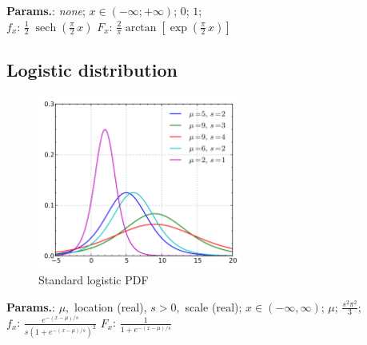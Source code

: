     {\color{darkblue} \textbf{Params.}:} {\textit{none}}; {$x \in (-\infty; +\infty)\!$}; {$0$}; {$1$};\hspace{0.5cm}\\{\color{darkblue} \textbf{$f_x$}:} {$\frac12 \; \operatorname{sech}\!\left(\frac{\pi}{2}\,x\right)\!$}{\color{darkblue} \textbf{$F_x$}:} {$\frac{2}{\pi} \arctan\!\left[\exp\!\left(\frac{\pi}{2}\,x\right)\right]\!$}



    
        
\subsection{Logistic distribution}


    \begin{figure}[H]
        \centering
        \includegraphics[width=0.6\textwidth]{images/Logisticpdfunction.png}
        \caption{Standard logistic PDF}
    \end{figure}




    {\color{darkblue} \textbf{Params.}:} {$\mu,$ location (real),  $s > 0,$ scale (real)}; {$x \in (-\infty, \infty)$}; {$\mu$}; {$\frac{s^2 \pi^2}{3}$};\hspace{0.5cm}\\{\color{darkblue} \textbf{$f_x$}:} {$\frac{e^{-(x-\mu)/s}} {s\left(1+e^{-(x-\mu)/s}\right)^2}$}{\color{darkblue} \textbf{$F_x$}:} {$\frac{1}{1+e^{-(x-\mu)/s}}$}



